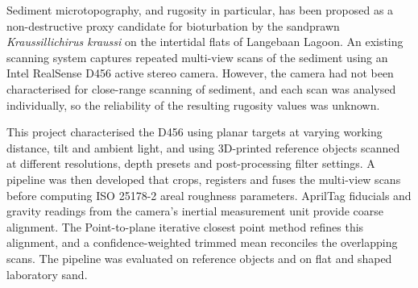 %
%
%

Sediment microtopography, and rugosity in particular, has been proposed as a non-destructive proxy  candidate for bioturbation by the sandprawn \textit{Kraussillichirus kraussi} on the intertidal flats of Langebaan Lagoon. An existing scanning system captures repeated multi-view scans of the sediment using an Intel RealSense D456 active stereo camera. However, the camera had not been characterised for close-range scanning of sediment, and each scan was analysed individually, so the reliability of the resulting rugosity values was unknown.

This project characterised the D456 using planar targets at varying working distance, tilt and ambient light, and using 3D-printed reference objects scanned at different resolutions, depth presets and post-processing filter settings. A pipeline was then developed that crops, registers and fuses the multi-view scans before computing ISO 25178-2 areal roughness parameters. AprilTag fiducials and gravity readings from the camera's inertial measurement unit provide coarse alignment. The Point-to-plane iterative closest point method refines this alignment, and a confidence-weighted trimmed mean reconciles the overlapping scans. The pipeline was evaluated on reference objects and on flat and shaped laboratory sand.

